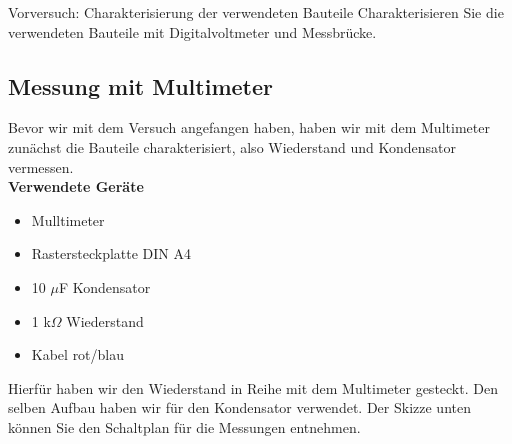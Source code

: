 \documentclass[twoside]{protokoll}
\begin{document}
\begin{aufgabe}{Vorversuch: Charakterisierung der verwendeten Bauteile}
  Charakterisieren Sie die verwendeten Bauteile mit Digitalvoltmeter
  und Messbrücke.
  
\subsection{Messung mit Multimeter}
  
  Bevor wir mit dem Versuch angefangen haben, haben wir mit dem Multimeter zunächst die Bauteile charakterisiert, also Wiederstand und Kondensator vermessen.  \\
  
  \textbf{Verwendete Geräte}
  \begin{itemize}
  \item Mulltimeter
  \item Rastersteckplatte DIN A4
  \item 10 $\mu$F Kondensator
  \item 1 k$\Omega$ Wiederstand
  \item Kabel rot/blau
  
  \end{itemize}
  
  Hierfür haben wir den Wiederstand in Reihe mit dem Multimeter gesteckt.
  Den selben Aufbau haben wir für den Kondensator verwendet.
  Der Skizze unten können Sie den Schaltplan für die Messungen entnehmen.
  

\end{aufgabe}
\end{document}
